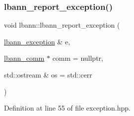 \subsubsection{\texorpdfstring{lbann\+\_\+report\+\_\+exception()}{lbann\_report\_exception()}}
{\footnotesize\ttfamily void lbann\+::lbann\+\_\+report\+\_\+exception (\begin{DoxyParamCaption}\item[{\hyperlink{classlbann_1_1lbann__exception}{lbann\+\_\+exception} \&}]{e,  }\item[{\hyperlink{classlbann_1_1lbann__comm}{lbann\+\_\+comm} $\ast$}]{comm = {\ttfamily nullptr},  }\item[{std\+::ostream \&}]{os = {\ttfamily std\+:\+:cerr} }\end{DoxyParamCaption})\hspace{0.3cm}{\ttfamily [inline]}}



Definition at line 55 of file exception.\+hpp.


